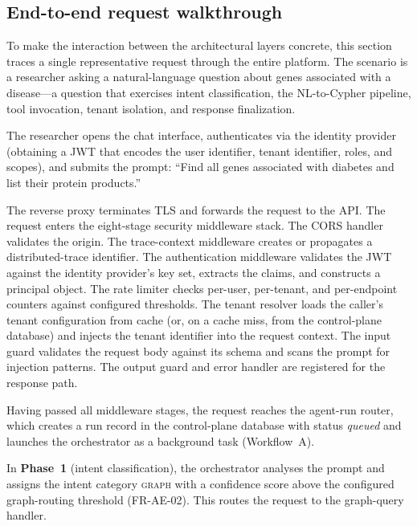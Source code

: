 \documentclass[a4paper,noexaminfo]{sapthesis}
\begin{document}
\subsection{End-to-end request walkthrough}
\label{sec:request-walkthrough}

To make the interaction between the architectural layers concrete, this
section traces a single representative request through the entire platform.
The scenario is a researcher asking a natural-language question about genes
associated with a disease---a question that exercises intent
classification, the NL-to-Cypher pipeline, tool invocation, tenant
isolation, and response finalization.

The researcher opens the chat interface, authenticates via the identity
provider (obtaining a JWT that encodes the user identifier, tenant
identifier, roles, and scopes), and submits the prompt: ``Find all genes
associated with diabetes and list their protein products.''

The reverse proxy terminates TLS and forwards the request to the API.
The request enters the eight-stage security middleware stack.  The CORS
handler validates the origin.  The trace-context middleware creates or
propagates a distributed-trace identifier.  The authentication middleware
validates the JWT against the identity provider's key set, extracts the
claims, and constructs a principal object.  The rate limiter checks
per-user, per-tenant, and per-endpoint counters against configured
thresholds.  The tenant resolver loads the caller's tenant configuration
from cache (or, on a cache miss, from the control-plane database) and
injects the tenant identifier into the request context.  The input guard
validates the request body against its schema and scans the prompt for
injection patterns.  The output guard and error handler are registered for
the response path.

Having passed all middleware stages, the request reaches the agent-run
router, which creates a run record in the control-plane database with
status \emph{queued} and launches the orchestrator as a background task
(Workflow~A).

In \textbf{Phase~1} (intent classification), the orchestrator analyses the
prompt and assigns the intent category \textsc{graph} with a confidence
score above the configured graph-routing threshold (FR-AE-02).  This routes
the request to the graph-query handler.
\end{document}
